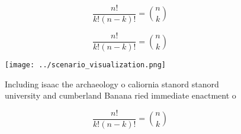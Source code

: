 \documentclass[a4paper]{article}
\begin{document}
\[ \frac{n!}{k!(n-k)!} = \binom{n}{k} \]

\[ \frac{n!}{k!(n-k)!} = \binom{n}{k} \]

\begin{figure}
\centering
\texttt{[image: ../scenario\_visualization.png]}
\caption{Including isaac the archaeology o caliornia stanord stanord university and cumberland Banana ried immediate enactment o
}
\end{figure}
 
\[ \frac{n!}{k!(n-k)!} = \binom{n}{k} \]
\end{document}
